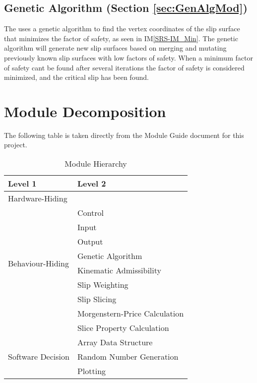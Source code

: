 \documentclass[12pt, titlepage]{article}
\begin{document}
\subsection*{Genetic Algorithm (Section \ref{sec:GenAlgMod})}
The uses a genetic algorithm to find the vertex coordinates of the
slip surface that minimizes the factor of safety, as seen in
IM\ref{SRS-IM_Min}. The genetic algorithm will generate new slip
surfaces based on merging and mutating previously known slip surfaces
with low factors of safety. When a minimum factor of safety cant be
found after several iterations the factor of safety is considered
minimized, and the critical slip has been found.


\section{Module Decomposition}

The following table is taken directly from the Module Guide document for this 
project.

\begin{table}[h!]
	\centering
	\begin{tabular}{p{} p{} }
		\toprule
		\textbf{Level 1} & \textbf{Level 2} \\
		\midrule
		
		{Hardware-Hiding} & ~ \\
		\midrule
		
		\multirow{8}{0.3\textwidth}{Behaviour-Hiding} &
		Control \\
		& Input \\
		& Output \\
		& Genetic Algorithm \\
		& Kinematic Admissibility \\
		& Slip Weighting \\
		& Slip Slicing \\
		& Morgenstern-Price Calculation \\
		& Slice Property Calculation \\
		\midrule
		
		\multirow{3}{0.3\textwidth}{Software Decision} &
		Array Data Structure \\
		& Random Number Generation \\
		& Plotting \\
		\bottomrule
		
	\end{tabular}
	\caption{Module Hierarchy}
	\label{Table:Decomp}
\end{table}
\end{document}
